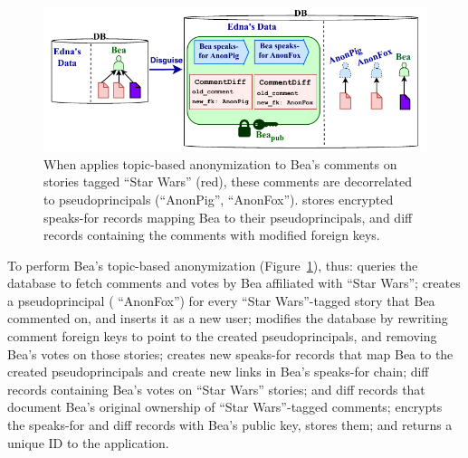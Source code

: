 \begin{figure}[h]
\centering
\includegraphics{figs/lobsters_catanon_visual}
\caption{When \sys applies topic-based anonymization to Bea's comments on
    stories tagged ``Star Wars'' (red), these comments are decorrelated to
    pseudoprincipals (``AnonPig'', ``AnonFox''). \sys stores encrypted
    speaks-for records mapping Bea to their
    pseudoprincipals, and diff records containing the comments with
    modified foreign keys.}
\label{f:lobsters_visual}
\end{figure}


%
To perform Bea's topic-based anonymization (Figure~\ref{f:lobsters_visual}),
\sys thus:
%
\one{} queries the database to fetch comments and votes by Bea
affiliated with ``Star Wars'';
%
\two{} creates a pseudoprincipal (\eg
``AnonFox'') for every ``Star Wars''-tagged story that Bea commented
on, and inserts it as a new user;
%
\three{} modifies the database by rewriting comment
foreign keys to point to the created pseudoprincipals, and
removing Bea's votes on those stories;
%
\four{} creates new speaks-for records that map Bea to the created
pseudoprincipals and create new links in Bea's speaks-for chain; diff records
containing Bea's votes on ``Star Wars'' stories; and diff records that document
Bea's original ownership of ``Star Wars''-tagged comments;
%
\five{} encrypts the speaks-for and diff records with Bea's public key, stores
them; and
%
\six{} returns a unique \xx ID to the application.

%
%
%

